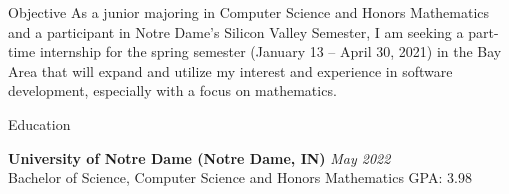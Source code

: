 \documentclass[10pt]{resume} %
\begin{document}
\begin{rSection}{Objective}
 As a junior majoring in Computer Science and Honors Mathematics and a participant in Notre Dame’s Silicon Valley Semester, I am seeking a part-time internship for the spring semester (January 13 – April 30, 2021) in the Bay Area that will expand and utilize my interest and experience in software development, especially with a focus on mathematics.
\end{rSection}




\begin{rSection}{Education}

{\bf University of Notre Dame (Notre Dame, IN) } \hfill { \em May 2022 } 
\\Bachelor of Science, Computer Science and Honors Mathematics\hfill { GPA: 3.98 }

\end{rSection}


\end{document}
